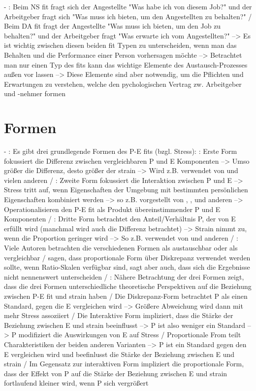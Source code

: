- \cite[S. 3]{caplan:1987}: Beim NS fit fragt sich der Angestellte "Was habe ich von diesem Job?" und der Arbeitgeber fragt sich "Was muss ich bieten, um den Angestellten zu behalten?" / Beim DA fit fragt der Angestellte "Was muss ich bieten, um den Job zu behalten?" und der Arbeitgeber fragt "Was erwarte ich vom Angestellten?" --> Es ist wichtig zwischen diesen beiden fit Typen zu unterscheiden, wenn man das Behalten und die Performance einer Person vorhersagen möchte --> Betrachtet man nur einen Typ des fits kann das wichtige Elemente des Austausch-Prozesses außen vor lassen --> Diese Elemente sind aber notwendig, um die Pflichten und Erwartungen zu verstehen, welche den pychologischen Vertrag zw. Arbeitgeber und -nehmer formen \\

\section{Formen}
\label{ch:personEnvironmentFit:formen}
- \cite[S. 5]{edwards:1990}: Es gibt drei grundlegende Formen des P-E fits (bzgl. Stress): \cite[S. 5]{edwards:1990}: Erste Form fokussiert die Differenz zwischen vergleichbaren P und E Komponenten --> Umso größer die Differenz, desto größer der strain --> Wird z.B. verwendet von \textcite{mechanismsOfJobStressAndStrain:1982} und vielen anderen / \cite[S. 5]{edwards:1990}: Zweite Form fokussiert die Interaktion zwischen P und E --> Stress tritt auf, wenn Eigenschaften der Umgebung mit bestimmten persönlichen Eigenschaften kombiniert werden --> so z.B. vorgestellt von \textcite{cherringtonEngland:1980}, \textcite{lyons:1971}, \textcite{obrien:1980} und anderen --> Operationalisieren den P-E fit als Produkt übereinstimmender P und E Komponenten / \cite[S. 5]{edwards:1990}: Dritte Form betrachtet den Anteil/Verhältnis P, der von E erfüllt wird (manchmal wird auch die Differenz betrachtet) --> Strain nimmt zu, wenn die Proportion geringer wird --> So z.B. verwendet von \textcite{mechanismsOfJobStressAndStrain:1982} und anderen / \cite[S. 5]{edwards:1990}: Viele Autoren betrachten die verschiedenen Formen als austauschbar oder als vergleichbar /  \textcite{mechanismsOfJobStressAndStrain:1982} sagen, dass proportionale Form über Diskrepanz verwendet werden sollte, wenn Ratio-Skalen verfügbar sind, sagt aber auch, dass sich die Ergebnisse nicht nennenswert unterscheiden / \cite[S. 5]{edwards:1990}: Nähere Betrachtung der drei Formen zeigt, dass die drei Formen unterschiedliche theoretische Perspektiven auf die Beziehung zwischen P-E fit und strain haben / Die Diskrepanz-Form betrachtet P als einen Standard, gegen die E vergleichen wird --> Größere Abweichung wird dann mit mehr Stress assoziiert / Die Interaktive Form impliziert, dass die Stärke der Beziehung zwischen E und strain beeinflusst --> P ist also weniger ein Standard --> P modifiziert die Auswirkungen von E auf Stress / Proportionale From teilt Charakteristiken der beiden anderen Varianten --> P ist ein Standard gegen den E vergleichen wird und beefinlusst die Stärke der Beziehung zwischen E und strain / Im Gegensatz zur interaktiven Form impliziert die proportionale Form, dass der Effekt von P auf die Stärke der Beziehung zwischen E und strain fortlaufend kleiner wird, wenn P sich vergrößert \\
